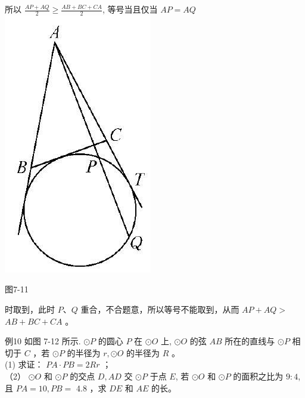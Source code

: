 \documentclass[10pt]{article}
\begin{document}
所以 $\frac{A P+A Q}{2} \geqslant \frac{A B+B C+C A}{2}$, 等号当且仅当 $A P=A Q$\\
\includegraphics[max width=\textwidth, center]{2024_10_30_66b8e5e701da2093c133g-055(2)}

图7-11

时取到，此时 $P 、 Q$ 重合，不合题意，所以等号不能取到，从而 $A P+A Q>$ $A B+B C+C A$ 。

例10 如图 7-12 所示. $\odot P$ 的圆心 $P$ 在 $\odot O$ 上, $\odot O$ 的弦 $A B$ 所在的直线与 $\odot P$ 相切于 $C$ ，若 $\odot P$ 的半径为 $r, \odot O$ 的半径为 $R$ 。\\
(1) 求证： $P A \cdot P B=2 R r$ ；\\
（2） $\odot O$ 和 $\odot P$ 的交点 $D, A D$ 交 $\odot P$ 于点 $E$, 若 $\odot O$ 和 $\odot P$ 的面积之比为 $9: 4$, 且 $P A=10, P B=$ 4.8 ，求 $D E$ 和 $A E$ 的长。
\end{document}
